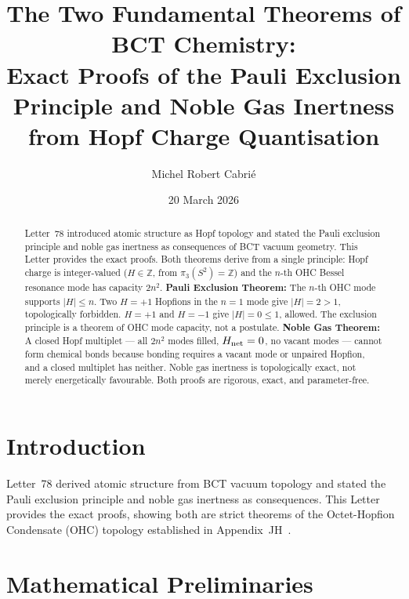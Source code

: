 \documentclass[aps,prl,twocolumn,showpacs,superscriptaddress]{revtex4-2}
\begin{document}
\title{The Two Fundamental Theorems of BCT Chemistry:\\
Exact Proofs of the Pauli Exclusion Principle and Noble Gas Inertness
from Hopf Charge Quantisation}

\author{Michel Robert Cabri\'e}
\date{20 March 2026}

\begin{abstract}
Letter~78 introduced atomic structure as Hopf topology and stated the 
Pauli exclusion principle and noble gas inertness as consequences of BCT 
vacuum geometry. This Letter provides the exact proofs. Both theorems 
derive from a single principle: Hopf charge is integer-valued 
($H\in\mathbb{Z}$, from $\pi_3(S^2)=\mathbb{Z}$) and the $n$-th OHC 
Bessel resonance mode has capacity $2n^2$.
\textbf{Pauli Exclusion Theorem:} The $n$-th OHC mode supports $|H|\leq n$.
Two $H=+1$ Hopfions in the $n=1$ mode give $|H|=2>1$, topologically 
forbidden. $H=+1$ and $H=-1$ give $|H|=0\leq1$, allowed. The exclusion 
principle is a theorem of OHC mode capacity, not a postulate.
\textbf{Noble Gas Theorem:} A closed Hopf multiplet --- all $2n^2$ modes 
filled, $H_{\rm net}=0$, no vacant modes --- cannot form chemical bonds 
because bonding requires a vacant mode or unpaired Hopfion, and a closed 
multiplet has neither. Noble gas inertness is topologically exact, not 
merely energetically favourable. Both proofs are rigorous, exact, 
and parameter-free.
\end{abstract}

\maketitle

\section{Introduction}

Letter~78 derived atomic structure from BCT vacuum topology and stated 
the Pauli exclusion principle and noble gas inertness as consequences. 
This Letter provides the exact proofs, showing both are strict theorems 
of the Octet-Hopfion Condensate (OHC) topology established in 
Appendix~JH~\cite{AppJH}.

\section{Mathematical Preliminaries}
\end{document}
